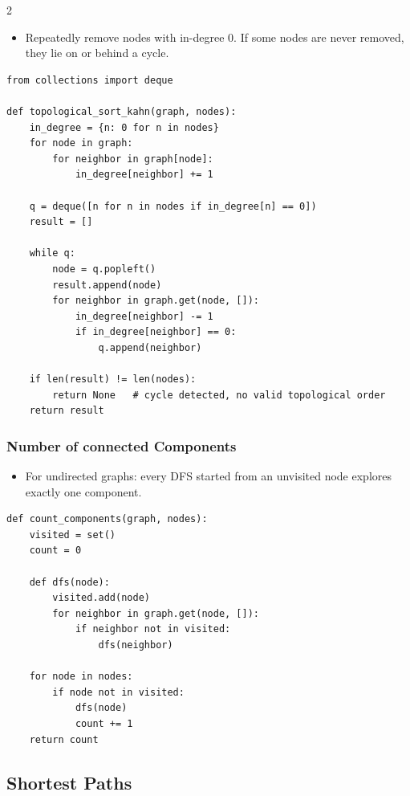 \documentclass[9pt,a4paper]{extarticle}
\begin{document}
\begin{multicols}{2}
\begin{itemize}
\item Repeatedly remove nodes with in-degree 0. If some nodes are never removed, they lie on or behind a cycle.
\end{itemize}

\begin{lstlisting}
from collections import deque

def topological_sort_kahn(graph, nodes):
    in_degree = {n: 0 for n in nodes}
    for node in graph:
        for neighbor in graph[node]:
            in_degree[neighbor] += 1

    q = deque([n for n in nodes if in_degree[n] == 0])
    result = []

    while q:
        node = q.popleft()
        result.append(node)
        for neighbor in graph.get(node, []):
            in_degree[neighbor] -= 1
            if in_degree[neighbor] == 0:
                q.append(neighbor)

    if len(result) != len(nodes):
        return None   # cycle detected, no valid topological order
    return result
\end{lstlisting}

\subsubsection{Number of connected Components}

\begin{itemize}
\item For undirected graphs: every DFS started from an unvisited node explores exactly one component.
\end{itemize}

\begin{lstlisting}
def count_components(graph, nodes):
    visited = set()
    count = 0

    def dfs(node):
        visited.add(node)
        for neighbor in graph.get(node, []):
            if neighbor not in visited:
                dfs(neighbor)

    for node in nodes:
        if node not in visited:
            dfs(node)
            count += 1
    return count
\end{lstlisting}

\subsection{Shortest Paths}


\end{multicols}
\end{document}
